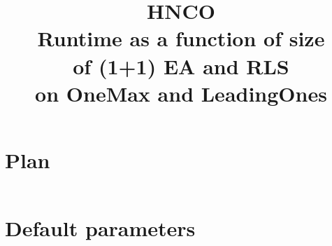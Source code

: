 \documentclass[a4paper]{article}
\begin{document}

\title{HNCO\\
  Runtime as a function of size \\
  of (1+1) EA and RLS \\
  on OneMax and LeadingOnes}
\maketitle

\tableofcontents



\appendix

\section{Plan}

\inputminted[breaklines=true]{json}{../plan-compact.json}

\section{Default parameters}

\inputminted[breaklines=true]{text}{../log.default}
\end{document}
